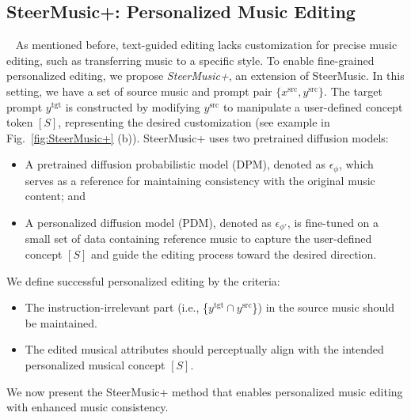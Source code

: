 \subsection{SteerMusic+: Personalized Music Editing}~\label{sec:SteerMusic+}
As mentioned before, text-guided editing lacks customization for precise music editing, such as transferring music to a specific style. To enable fine-grained personalized editing, we propose 
\textit{SteerMusic+}, an extension of SteerMusic. In this setting, we have a set of source music and prompt pair $\{x^{\text{src}},y^{\text{src}}\}$. The target prompt $y^{\text{tgt}}$ is constructed by modifying $y^{\text{src}}$ to manipulate a user-defined concept token $[S]$, representing the desired customization (see example in Fig.~\ref{fig:SteerMusic+} (b)). SteerMusic+ uses two pretrained diffusion models:
\begin{itemize}
    \item A pretrained diffusion probabilistic model (DPM), denoted as $\epsilon_{\phi}$, which serves as a reference for maintaining consistency with the original music content; and
    \item A personalized diffusion model (PDM), denoted as $\epsilon_{\phi '}$, is fine-tuned on a small set of data containing reference music to capture the user-defined concept $[S]$ and guide the editing process toward the desired direction.
\end{itemize}
We define successful personalized editing by the criteria:
\begin{itemize} 
\item The instruction-irrelevant part (i.e., \{$y^{\text{tgt}}\cap y^{\text{src}}$\}) in the source music should be maintained.
\item The edited musical attributes should perceptually align with the intended personalized musical concept $[S]$.
\end{itemize}
We now present the SteerMusic+ method that enables personalized music editing with enhanced music consistency.

